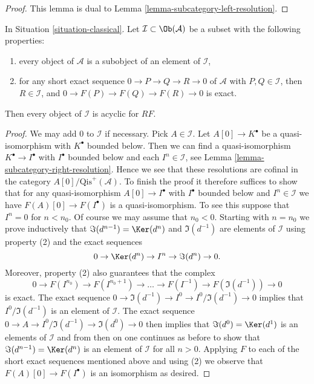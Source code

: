 \begin{proof}
This lemma is dual to Lemma \ref{lemma-subcategory-left-resolution}.
\end{proof}

\begin{lemma}
\label{lemma-subcategory-right-acyclics}
In
Situation \ref{situation-classical}.
Let $\mathcal{I} \subset \Ob(\mathcal{A})$ be a subset with the
following properties:
\begin{enumerate}
\item every object of $\mathcal{A}$ is a subobject of an element of
$\mathcal{I}$,
\item for any short exact sequence $0 \to P \to Q \to R \to 0$ of
$\mathcal{A}$ with $P, Q \in \mathcal{I}$, then $R \in \mathcal{I}$,
and $0 \to F(P) \to F(Q) \to F(R) \to 0$ is exact.
\end{enumerate}
Then every object of $\mathcal{I}$ is acyclic for $RF$.
\end{lemma}

\begin{proof}
We may add $0$ to $\mathcal{I}$ if necessary. Pick $A \in \mathcal{I}$.
Let $A[0] \to K^\bullet$ be a quasi-isomorphism with $K^\bullet$
bounded below. Then we can find a quasi-isomorphism
$K^\bullet \to I^\bullet$ with $I^\bullet$ bounded below and
each $I^n \in \mathcal{I}$, see
Lemma \ref{lemma-subcategory-right-resolution}.
Hence we see that these resolutions are cofinal in the category
$A[0]/\text{Qis}^{+}(\mathcal{A})$. To finish the proof it therefore
suffices to show that for any quasi-isomorphism
$A[0] \to I^\bullet$ with $I^\bullet$ bounded below and $I^n \in \mathcal{I}$
we have $F(A)[0] \to F(I^\bullet)$ is a quasi-isomorphism.
To see this suppose that $I^n = 0$ for $n < n_0$. Of course we may assume
that $n_0 < 0$. Starting with $n = n_0$ we prove inductively that
$\Im(d^{n - 1}) = \Ker(d^n)$ and $\Im(d^{-1})$
are elements of $\mathcal{I}$ using property (2) and the exact sequences
$$
0 \to \Ker(d^n) \to I^n \to \Im(d^n) \to 0.
$$
Moreover, property (2) also guarantees that the complex
$$
0 \to F(I^{n_0}) \to F(I^{n_0 + 1}) \to \ldots \to F(I^{-1}) \to
F(\Im(d^{-1})) \to 0
$$
is exact. The exact sequence
$0 \to \Im(d^{-1}) \to I^0 \to I^0/\Im(d^{-1}) \to 0$
implies that $I^0/\Im(d^{-1})$ is an element of $\mathcal{I}$.
The exact sequence $0 \to A \to I^0/\Im(d^{-1}) \to \Im(d^0) \to 0$
then implies that $\Im(d^0) = \Ker(d^1)$ is an elements of
$\mathcal{I}$ and from then on one continues as before to show that
$\Im(d^{n - 1}) = \Ker(d^n)$ is an element of $\mathcal{I}$
for all $n > 0$. Applying $F$ to each of the short exact sequences
mentioned above and using (2) we observe that $F(A)[0] \to F(I^\bullet)$
is an isomorphism as desired.
\end{proof}

